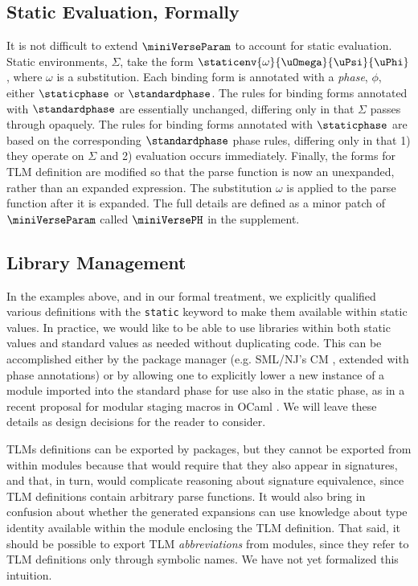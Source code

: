 \documentclass[acmsmall,10pt,review,anonymous]{acmart}\settopmatter{printfolios=true}
\newcommand{\li}[1]{\lstinline{#1}}
\begin{document}
\subsection{Static Evaluation, Formally}
It is not difficult to extend $\miniVerseParam$ to account for static evaluation. Static environments, $\Sigma$, take the form $\staticenv{\omega}{\uOmega}{\uPsi}{\uPhi}$, where $\omega$ is a substitution. Each binding form is annotated with a \emph{phase}, $\phi$, either $\staticphase$ or $\standardphase$. The rules for binding forms annotated with $\standardphase$ are essentially unchanged, differing only in that $\Sigma$ passes through opaquely. The rules for binding forms annotated with $\staticphase$ are based on the corresponding $\standardphase$ phase rules, differing only in that 1) they operate on $\Sigma$ and 2) evaluation occurs immediately. Finally, the forms for TLM definition are modified so that the parse function is now an unexpanded, rather than an expanded expression. The substitution $\omega$ is applied to the parse function after it is expanded. The full details are defined as a minor patch of $\miniVerseParam$ called $\miniVersePH$ in the supplement.

\subsection{Library Management}
In the examples above, and in our formal treatment, we explicitly qualified various definitions with the \li{static} keyword to make them available within static values. In practice, we would like to be able to use libraries within both static values and standard values as needed without duplicating code. This can be accomplished either by the package manager (e.g. SML/NJ's CM \cite{blume:smlnj-cm}, extended with phase annotations) or by allowing one to explicitly lower a new instance of a module imported into the standard phase for use also in  the static phase, as in a recent proposal for modular staging macros in OCaml \cite{Ocaml/macros}. We will leave these details as design decisions for the reader to consider.

TLMs definitions can be exported by packages, but they cannot be exported from within modules because that would require that they also appear in signatures, and that, in turn, would complicate reasoning about signature equivalence, since TLM definitions contain arbitrary parse functions. It would also bring in confusion about whether the generated expansions can use knowledge about type identity available  within the module enclosing the TLM definition. That said, it should be possible to export TLM \emph{abbreviations} from modules, since they refer to TLM definitions only through symbolic names. We have not yet formalized this intuition. 
\end{document}
